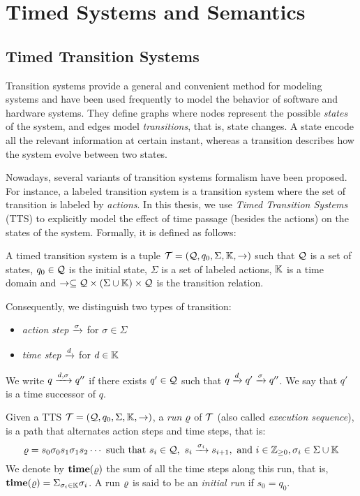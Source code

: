 \chapter{Timed Systems and Semantics}\label{chap:2} 
\minitoc
\section{Timed Transition Systems}
Transition systems provide a general and convenient method for modeling 
systems and have been used frequently to model the behavior of 
software and hardware systems. They define graphs where nodes
represent the possible \emph{states} of the system, and edges model 
\emph{transitions}, that is, state changes. A state encode all the relevant 
information at certain instant, whereas a transition describes how the system
evolve between two states. 

Nowadays, several variants of transition systems formalism have been 
proposed. For instance, a labeled transition system is a transition system
where the set of transition is labeled by \emph{actions}.
In this thesis, we use \emph{Timed Transition Systems} (TTS)
to explicitly model the effect of time passage (besides the actions)
on the states of the system. Formally, it is defined as follows:  

\begin{definition}
  A timed transition system is a tuple $\mathcal{T}=(\mathcal{Q},q_0,\Sigma,\mathbb{K},\to)$ such that $\mathcal{Q}$ is 
  a set of states, $q_0\in\mathcal{Q}$ is the initial state, $\Sigma$ is a set of
  labeled actions, $\mathbb{K}$ is a time domain and $\to\subseteq\mathcal{Q}\times
  (\Sigma\cup\mathbb{K})\times\mathcal{Q}$ is the transition relation.
\end{definition}
Consequently, we distinguish two types of transition:
\begin{itemize}
  \item \emph{action step} $\xrightarrow{\sigma}$ for $\sigma\in\Sigma$ 
  \item \emph{time step} $\xrightarrow{d}$ for $d\in\mathbb{K}$
\end{itemize}
We write $q\xrightarrow{d,\sigma}q''$ if there exists $q'\in\mathcal{Q}$
such that $q\xrightarrow{d}q'\xrightarrow{\sigma}q''$. We say that $q'$ is
a time successor of $q$.

Given a TTS $\mathcal{T}=(\mathcal{Q},q_0,\Sigma,\mathbb{K},\to)$, a \emph{run} $\varrho$ of $\mathcal{T}$ (also called 
\emph{execution sequence}), is a path that alternates action steps and 
time steps, that is:
\begin{displaymath}
  \varrho=s_0\sigma_0 s_1\sigma_1 s_2\cdots \text{ such that } 
  s_i\in\mathcal{Q}, \  s_i\xrightarrow{\sigma_{i}}s_{i+1},\text{ and } 
  i\in\mathbb{Z}_{\ge 0},\sigma_i\in\Sigma\cup\mathbb{K}
\end{displaymath}
We denote by $\mathbf{time(\varrho)}$ the sum of all the time steps along this run,
that is, $\mathbf{time(\varrho)}=\Sigma_{\sigma_i\in\mathbb{K}}\sigma_i$. 
A run $\varrho$ is said to be an \emph{initial run} if $s_0=q_0$. 

